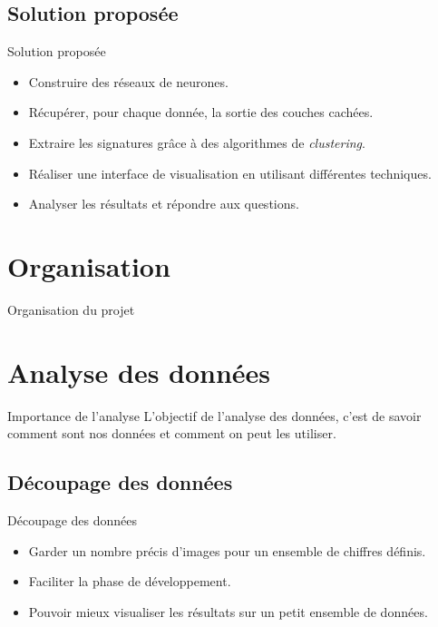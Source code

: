 \documentclass[10pt,handout]{beamer}
\begin{document}
\subsection{Solution proposée}
\begin{frame}{Solution proposée}
    \begin{itemize}
        \item Construire des réseaux de neurones.
        \item Récupérer, pour chaque donnée, la sortie des couches cachées.
        \item Extraire les signatures grâce à des algorithmes de \textit{clustering}.
        \item Réaliser une interface de visualisation en utilisant différentes techniques.
        \item Analyser les résultats et répondre aux questions.
    \end{itemize}
\end{frame}

\section{Organisation}
\begin{frame}{Organisation du projet}
    
\end{frame}

\section{Analyse des données}
\begin{frame}
    \begin{block}{Importance de l'analyse}
        L'objectif de l'analyse des données, c'est de savoir comment sont nos données et comment on peut les utiliser.
    \end{block}
\end{frame}
 

\subsection{Découpage des données}

\begin{frame}{Découpage des données}
    \begin{itemize}
        \item Garder un nombre précis d’images pour un ensemble de chiffres définis.
        \item Faciliter la phase de développement.
        \item Pouvoir mieux visualiser les résultats sur un petit
        ensemble de données.
    \end{itemize}
\end{frame}
\end{document}
